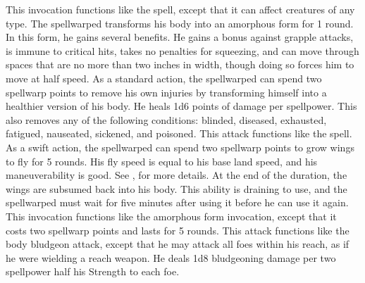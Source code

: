  This invocation functions like the 
spell, except that it can affect creatures of any type.
The spellwarped transforms his body into an amorphous form for 1 round.
In this form, he gains several benefits.
He gains a  bonus against grapple attacks, is immune to critical hits, takes no penalties for squeezing, and can move through spaces that are no more than two inches in width, though doing so forces him to move at half speed.
As a standard action, the spellwarped can spend two spellwarp points to remove his own injuries by transforming himself into a healthier version of his body.
He heals 1d6 points of damage per spellpower.
This also removes any of the following conditions: blinded, diseased, exhausted, fatigued, nauseated, sickened, and poisoned.
 This attack functions like the 
spell.
As a swift action, the spellwarped can spend two spellwarp points to grow wings to fly for 5 rounds.
His fly speed is equal to his base land speed, and his maneuverability is good.
See , for more details.
At the end of the duration, the wings are subsumed back into his body.
This ability is draining to use, and the spellwarped must wait for five minutes after using it before he can use it again.
This invocation functions like the amorphous form invocation, except that it costs two spellwarp points and lasts for 5 rounds.
This attack functions like the body bludgeon attack, except that he may attack all foes within his reach, as if he were wielding a reach weapon.
He deals 1d8 bludgeoning damage per two spellpower \add half his Strength to each foe.

